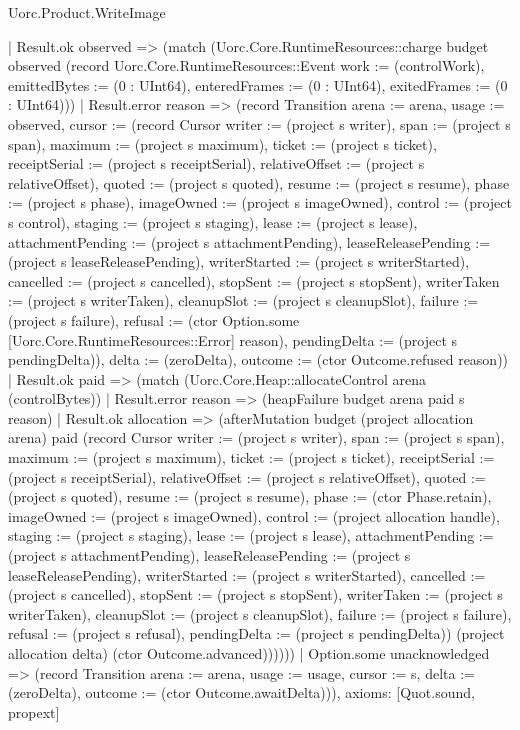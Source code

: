\begin{lexlean}{Uorc.Product.WriteImage}
\begin{semanticmodule}
{        | Result.ok observed => (match (Uorc.Core.RuntimeResources::charge budget observed (record Uorc.Core.RuntimeResources::Event {work := (controlWork), emittedBytes := (0 : UInt64), enteredFrames := (0 : UInt64), exitedFrames := (0 : UInt64)}))
          | Result.error reason => (record Transition {arena := arena, usage := observed, cursor := (record Cursor {writer := (project s writer), span := (project s span), maximum := (project s maximum), ticket := (project s ticket), receiptSerial := (project s receiptSerial), relativeOffset := (project s relativeOffset), quoted := (project s quoted), resume := (project s resume), phase := (project s phase), imageOwned := (project s imageOwned), control := (project s control), staging := (project s staging), lease := (project s lease), attachmentPending := (project s attachmentPending), leaseReleasePending := (project s leaseReleasePending), writerStarted := (project s writerStarted), cancelled := (project s cancelled), stopSent := (project s stopSent), writerTaken := (project s writerTaken), cleanupSlot := (project s cleanupSlot), failure := (project s failure), refusal := (ctor Option.some [Uorc.Core.RuntimeResources::Error] reason), pendingDelta := (project s pendingDelta)}), delta := (zeroDelta), outcome := (ctor Outcome.refused reason)})
          | Result.ok paid => (match (Uorc.Core.Heap::allocateControl arena (controlBytes))
            | Result.error reason => (heapFailure budget arena paid s reason)
            | Result.ok allocation => (afterMutation budget (project allocation arena) paid (record Cursor {writer := (project s writer), span := (project s span), maximum := (project s maximum), ticket := (project s ticket), receiptSerial := (project s receiptSerial), relativeOffset := (project s relativeOffset), quoted := (project s quoted), resume := (project s resume), phase := (ctor Phase.retain), imageOwned := (project s imageOwned), control := (project allocation handle), staging := (project s staging), lease := (project s lease), attachmentPending := (project s attachmentPending), leaseReleasePending := (project s leaseReleasePending), writerStarted := (project s writerStarted), cancelled := (project s cancelled), stopSent := (project s stopSent), writerTaken := (project s writerTaken), cleanupSlot := (project s cleanupSlot), failure := (project s failure), refusal := (project s refusal), pendingDelta := (project s pendingDelta)}) (project allocation delta) (ctor Outcome.advanced))))))
    | Option.some unacknowledged => (record Transition {arena := arena, usage := usage, cursor := s, delta := (zeroDelta), outcome := (ctor Outcome.awaitDelta)})),
  axioms: [Quot.sound, propext]
}


\end{semanticmodule}
\end{lexlean}
